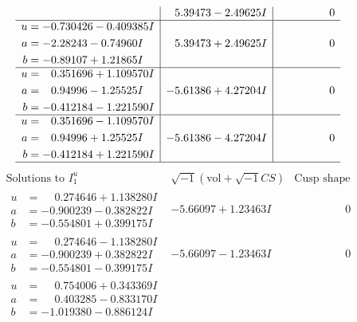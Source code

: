 \documentclass[1p]{elsarticle_modified}
\theoremstyle{definition}
\newcommand{\I}{\sqrt{-1}}
\begin{document}
$$\begin{array}{c|c|c}
 & \phantom{-}5.39473 - 2.49625 I & \phantom{-0.000000 } 0 \\ \hline\begin{aligned}
u &= -0.730426 - 0.409385 I \\
a &= -2.28243 - 0.74960 I \\
b &= -0.89107 + 1.21865 I\end{aligned}
 & \phantom{-}5.39473 + 2.49625 I & \phantom{-0.000000 } 0 \\ \hline\begin{aligned}
u &= \phantom{-}0.351696 + 1.109570 I \\
a &= \phantom{-}0.94996 - 1.25525 I \\
b &= -0.412184 - 1.221590 I\end{aligned}
 & -5.61386 + 4.27204 I & \phantom{-0.000000 } 0 \\ \hline\begin{aligned}
u &= \phantom{-}0.351696 - 1.109570 I \\
a &= \phantom{-}0.94996 + 1.25525 I \\
b &= -0.412184 + 1.221590 I\end{aligned}
 & -5.61386 - 4.27204 I & \phantom{-0.000000 } 0\\
 \hline 
 \end{array}$$\newpage$$\begin{array}{c|c|c}  
\text{Solutions to }I^u_{1}& \I (\text{vol} + \sqrt{-1}CS) & \text{Cusp shape}\\
 \hline 
\begin{aligned}
u &= \phantom{-}0.274646 + 1.138280 I \\
a &= -0.900239 - 0.382822 I \\
b &= -0.554801 + 0.399175 I\end{aligned}
 & -5.66097 + 1.23463 I & \phantom{-0.000000 } 0 \\ \hline\begin{aligned}
u &= \phantom{-}0.274646 - 1.138280 I \\
a &= -0.900239 + 0.382822 I \\
b &= -0.554801 - 0.399175 I\end{aligned}
 & -5.66097 - 1.23463 I & \phantom{-0.000000 } 0 \\ \hline\begin{aligned}
u &= \phantom{-}0.754006 + 0.343369 I \\
a &= \phantom{-}0.403285 - 0.833170 I \\
b &= -1.019380 - 0.886124 I\end{aligned}

\end{array}$$
\end{document}
